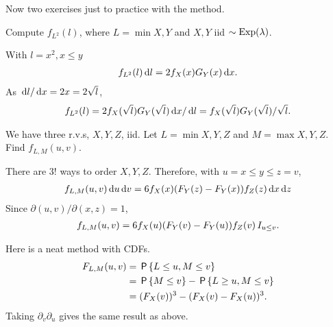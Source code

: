 \documentclass[a4paper,11pt]{article}
\begin{document}
Now two exercises just to practice with the method.

\begin{exercise}
Compute $f_{L^2}(l)$, where $L=\min{X,Y}$ and $X, Y$ iid $\sim \Exp{\lambda}$. 
\begin{solution}
With $l = x^{2}, x\leq y$
\begin{align*}
f_{L^2}(l) \d l = 2f_{X}(x) G_{Y}(x) \d x.
\end{align*}
As $\d l/\d x = 2 x = 2 \sqrt l$, 
\begin{align*}
f_{L^2}(l)  = 2f_{X}(\sqrt{l}) G_{Y}(\sqrt l ) \d x / \d l = f_{X}(\sqrt{l}) G_{Y}(\sqrt l ) /\sqrt l.
\end{align*}
\end{solution}

\end{exercise}


\begin{exercise}
We have three r.v.s, $X, Y, Z$, iid. Let $L=\min{X, Y, Z}$ and $M=\max{X, Y, Z}$. Find $f_{L,M}(u,v)$.
\begin{solution}
There are $3!$ ways to order $X, Y, Z$. Therefore, with $u=x \leq y \leq z = v$,
\begin{align*}
  f_{L,M}(u,v) \d u \d v= 6 f_{X}(x) (F_{Y}(z)-F_{Y}(x)) f_{Z}(z) \d x \d z
\end{align*}
Since $\partial(u,v)/\partial (x, z) = 1$, 
\begin{align*}
  f_{L,M}(u,v) = 6 f_{X}(u) (F_{Y}(v)-F_{Y}(u)) f_{Z}(v)\1{u\leq v}.
\end{align*}

Here is a neat method with CDFs.
\begin{align*}
  F_{L,M}(u,v) 
&= \P{L\leq u, M\leq v}\\
&= \P{M\leq v} - \P{L\geq u, M\leq v}\\
&= (F_{X}(v))^{3} - (F_{X}(v) - F_{X}(u))^{3}.
\end{align*}
Taking $\partial_{v}\partial_{u}$ gives the same result as above.
\end{solution}
\end{exercise}



\end{document}
